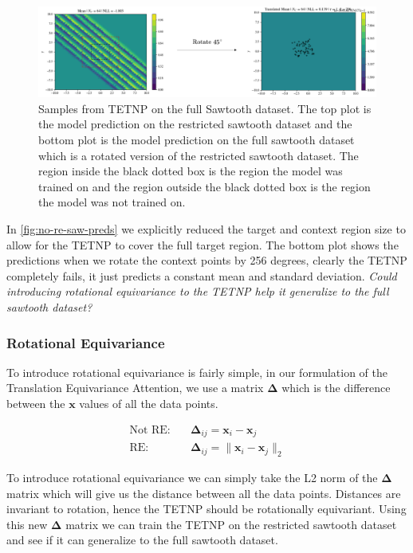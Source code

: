 \documentclass[../../main.tex]{subfiles}
\begin{document}
\begin{figure}[H]
    \centering
    \includegraphics[width=0.9\linewidth]{./fig/res-saw/no-re.png}
    \caption{Samples from TETNP on the full Sawtooth dataset. The top plot is the model prediction on the restricted sawtooth dataset and the bottom plot is the model prediction on the full sawtooth dataset which is a rotated version of the restricted sawtooth dataset.
    The region inside the black dotted box is the region the model was trained on and the region outside the black dotted box is the region the model was not trained on.}
    \label{fig:no-re-saw-preds}
\end{figure}

In \autoref{fig:no-re-saw-preds} we explicitly reduced the target and context region size to allow for the TETNP to cover the full target region. The bottom plot shows the predictions when we rotate the context points by 256 degrees, clearly the TETNP completely fails, it just predicts a constant mean and standard deviation. \emph{Could introducing rotational equivariance to the TETNP help it generalize to the full sawtooth dataset?}

\subsubsection{Rotational Equivariance}

To introduce rotational equivariance is fairly simple, in our formulation of the Translation Equivariance Attention, we use a matrix $\bm{\Delta}$ which is the difference between the $\bm{x}$ values of all the data points.

\begin{align}
    \text{Not RE}: \quad &\bm{\Delta}_{ij} = \bm{x}_i - \bm{x}_j\\
    \text{RE}: \quad &\bm{\Delta}_{ij} = \|\bm{x}_i - \bm{x}_j\|_2
\end{align}

To introduce rotational equivariance we can simply take the L2 norm of the $\bm{\Delta}$ matrix which will give us the distance between all the data points. Distances are invariant to rotation, hence the TETNP should be rotationally equivariant. Using this new $\bm{\Delta}$ matrix we can train the TETNP on the restricted sawtooth dataset and see if it can generalize to the full sawtooth dataset.
\end{document}
